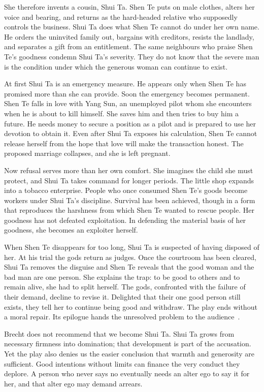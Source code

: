 ﻿\documentclass[12pt,a4paper]{book}
\begin{document}
She therefore invents a cousin, Shui Ta.  Shen Te puts on male clothes, alters
her voice and bearing, and returns as the hard-headed relative who supposedly
controls the business.  Shui Ta does what Shen Te cannot do under her own name.
He orders the uninvited family out, bargains with creditors, resists the
landlady, and separates a gift from an entitlement.  The same neighbours who
praise Shen Te's goodness condemn Shui Ta's severity.  They do not know that
the severe man is the condition under which the generous woman can continue
to exist.

At first Shui Ta is an emergency measure.  He appears only when Shen Te has
promised more than she can provide.  Soon the emergency becomes permanent.
Shen Te falls in love with Yang Sun, an unemployed pilot whom she encounters
when he is about to kill himself.  She saves him and then tries to buy him a
future.  He needs money to secure a position as a pilot and is prepared to use
her devotion to obtain it.  Even after Shui Ta exposes his calculation, Shen
Te cannot release herself from the hope that love will make the transaction
honest.  The proposed marriage collapses, and she is left pregnant.

Now refusal serves more than her own comfort.  She imagines the child she must
protect, and Shui Ta takes command for longer periods.  The little shop expands
into a tobacco enterprise.  People who once consumed Shen Te's goods become
workers under Shui Ta's discipline.  Survival has been achieved, though in a
form that reproduces the harshness from which Shen Te wanted to rescue people.
Her goodness has not defeated exploitation.  In defending the material basis
of her goodness, she becomes an exploiter herself.

When Shen Te disappears for too long, Shui Ta is suspected of having disposed
of her.  At his trial the gods return as judges.  Once the courtroom has been
cleared, Shui Ta removes the disguise and Shen Te reveals that the good woman
and the bad man are one person.  She explains the trap: to be good to others
and to remain alive, she had to split herself.  The gods, confronted with the
failure of their demand, decline to revise it.  Delighted that their one good
person still exists, they tell her to continue being good and withdraw.  The
play ends without a moral repair.  Its epilogue hands the unresolved problem
to the audience~\cite{Brecht-GMvS}.

Brecht does not recommend that we become Shui Ta.  Shui Ta grows from necessary
firmness into domination; that development is part of the accusation.  Yet the
play also denies us the easier conclusion that warmth and generosity are
sufficient.  Good intentions without limits can finance the very conduct they
deplore.  A person who never says no eventually needs an alter ego to say it
for her, and that alter ego may demand arrears.
\end{document}
